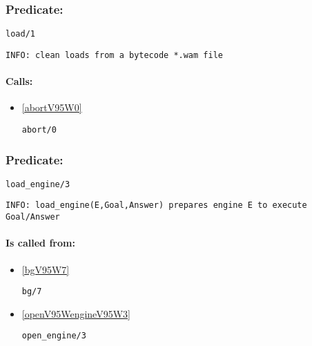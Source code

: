 \subsubsection{Predicate:} \label{loadV95W1}

\begin{verbatim}
load/1
\end{verbatim}

{\small \begin{verbatim}
INFO: clean loads from a bytecode *.wam file

\end{verbatim}}
\paragraph{Calls:} 
\begin{itemize}
\item \ref{abortV95W0} 
\begin{verbatim}
abort/0
\end{verbatim}

\end{itemize}

\subsubsection{Predicate:} \label{loadV95WengineV95W3}

\begin{verbatim}
load_engine/3
\end{verbatim}

{\small \begin{verbatim}
INFO: load_engine(E,Goal,Answer) prepares engine E to execute Goal/Answer

\end{verbatim}}
\paragraph{Is called from:} 
\begin{itemize}
\item \ref{bgV95W7} 
\begin{verbatim}
bg/7
\end{verbatim}

\item \ref{openV95WengineV95W3} 
\begin{verbatim}
open_engine/3
\end{verbatim}

\end{itemize}

